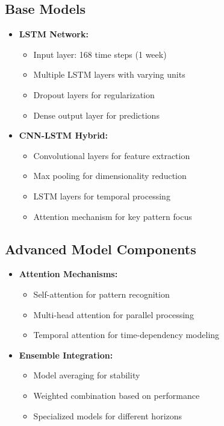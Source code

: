 \documentclass[12pt,a4paper]{report}
\begin{document}
\subsection{Base Models}
\begin{itemize}
\item \textbf{LSTM Network:}
  \begin{itemize}
    \item Input layer: 168 time steps (1 week)
    \item Multiple LSTM layers with varying units
    \item Dropout layers for regularization
    \item Dense output layer for predictions
  \end{itemize}

\item \textbf{CNN-LSTM Hybrid:}
  \begin{itemize}
    \item Convolutional layers for feature extraction
    \item Max pooling for dimensionality reduction
    \item LSTM layers for temporal processing
    \item Attention mechanism for key pattern focus
  \end{itemize}
\end{itemize}

\subsection{Advanced Model Components}
\begin{itemize}
\item \textbf{Attention Mechanisms:}
  \begin{itemize}
    \item Self-attention for pattern recognition
    \item Multi-head attention for parallel processing
    \item Temporal attention for time-dependency modeling
  \end{itemize}

\item \textbf{Ensemble Integration:}
  \begin{itemize}
    \item Model averaging for stability
    \item Weighted combination based on performance
    \item Specialized models for different horizons
  \end{itemize}
\end{itemize}
\end{document}
